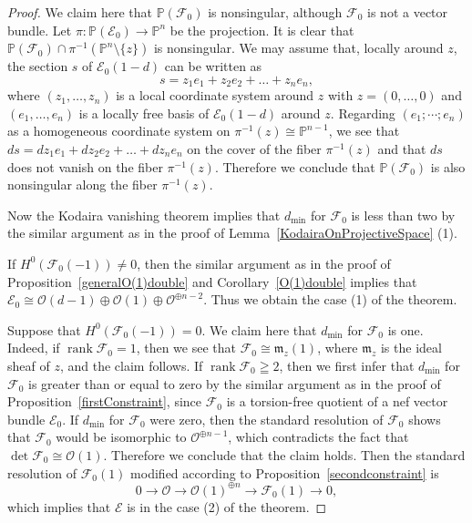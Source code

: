\documentclass[a4paper,12pt]{amsart}
\DeclareMathOperator{\rk}{rank}
\begin{document}
\begin{proof}
We claim here that $\mathbb{P}(\mathcal{F}_0)$ is nonsingular, although $\mathcal{F}_0$ is not a vector bundle.
Let $\pi:\mathbb{P}(\mathcal{E}_0)\to \mathbb{P}^n$ be the projection.
It is clear that $\mathbb{P}(\mathcal{F}_0)\cap \pi^{-1}(\mathbb{P}^n\setminus \{z\})$ is nonsingular.
We may assume that, locally around $z$, the section $s$ of $\mathcal{E}_0(1-d)$ can be written as 
\[s=z_1e_1+z_2e_2+\dots+z_ne_n,\]
where $(z_1,\dots,z_n)$ is a local coordinate system around $z$ with $z=(0,\dots,0)$
and $(e_1,\dots,e_n)$ is a locally free basis of $\mathcal{E}_0(1-d)$ around $z$.
Regarding $(e_1;\cdots;e_n)$ as a homogeneous coordinate system on $\pi^{-1}(z)\cong \mathbb{P}^{n-1}$,
we see that $ds=dz_1e_1+dz_2e_2+\dots+dz_ne_n$ on the cover of the fiber $\pi^{-1}(z)$
and that $ds$ does not vanish on the fiber $\pi^{-1}(z)$.
Therefore we conclude that $\mathbb{P}(\mathcal{F}_0)$ is also nonsingular along the fiber $\pi^{-1}(z)$.

Now the Kodaira vanishing theorem implies that $d_{\min}$ for $\mathcal{F}_0$ is less than two
by the similar argument as in the proof of Lemma~\ref{KodairaOnProjectiveSpace} (1).

If $H^0(\mathcal{F}_0(-1))\neq 0$, then the similar argument as in the proof of 
Proposition~\ref{generalO(1)double} and Corollary~\ref{O(1)double}
implies that $\mathcal{E}_0\cong \mathcal{O}(d-1)\oplus \mathcal{O}(1)\oplus \mathcal{O}^{\oplus n-2}$.
Thus we obtain the case (1) of the theorem.

Suppose that $H^0(\mathcal{F}_0(-1))=0$.  
We claim here that $d_{\min}$ for $\mathcal{F}_0$ is one.
Indeed, if $\rk \mathcal{F}_0=1$, then we see that $\mathcal{F}_0\cong \mathfrak{m}_z(1)$,
where $\mathfrak{m}_z$ is the ideal sheaf of $z$,
and the claim follows.
If $\rk \mathcal{F}_0\geqq 2$,
then we first infer that $d_{\min}$ for $\mathcal{F}_0$ is greater than or equal to zero
by the similar argument as in the proof of Proposition~\ref{firstConstraint},
since $\mathcal{F}_0$ is a torsion-free quotient of a nef vector bundle $\mathcal{E}_0$.
If $d_{\min}$ for $\mathcal{F}_0$ were zero,
then the standard resolution of $\mathcal{F}_0$ shows that $\mathcal{F}_0$ would be
isomorphic to $\mathcal{O}^{\oplus n-1}$,
which contradicts the fact that $\det\mathcal{F}_0\cong \mathcal{O}(1)$.
Therefore we conclude that the claim holds.
Then the standard resolution of 
$\mathcal{F}_0(1)$ modified according to Proposition~\ref{secondconstraint} is 
\[
0\to \mathcal{O}\to \mathcal{O}(1)^{\oplus n}\to \mathcal{F}_0(1)\to 0,
\]
which implies that $\mathcal{E}$ is in the case (2) of the theorem.
\end{proof}
\end{document}

